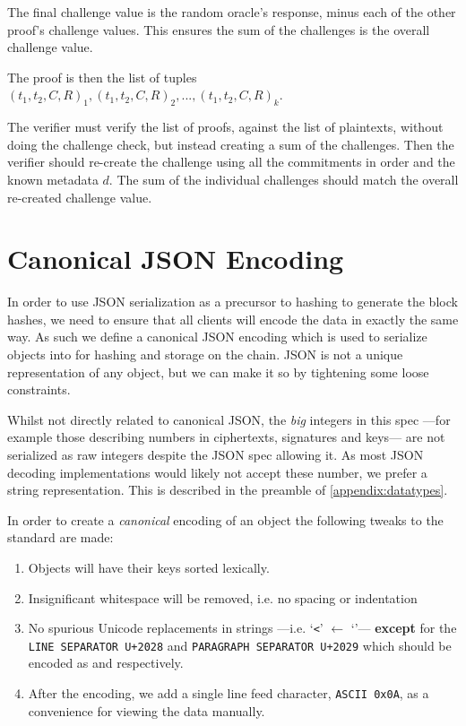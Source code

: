 The final challenge value is the random oracle's response, minus each of the other proof's challenge values. This ensures the sum of the challenges is the overall challenge value.

The proof is then the list of tuples $(t_1, t_2, C, R)_1, (t_1, t_2, C, R)_2, ..., (t_1, t_2, C, R)_k$.

The verifier must verify the list of proofs, against the list of plaintexts, without doing the challenge check, but instead creating a sum of the challenges. Then the verifier should re-create the challenge using all the commitments in order and the known metadata $d$. The sum of the individual challenges should match the overall re-created challenge value.

\section*{Canonical JSON Encoding}
\label{proc:json}

In order to use JSON serialization as a precursor to hashing to generate the block hashes, we need to ensure that all clients will encode the data in exactly the same way. As such we define a canonical JSON encoding which is used to serialize objects into for hashing and storage on the chain. JSON is not a unique representation of any object, but we can make it so by tightening some loose constraints.

Whilst not directly related to canonical JSON, the \emph{big} integers in this spec ---for example those describing numbers in ciphertexts, signatures and keys--- are not serialized as raw integers despite the JSON spec allowing it. As most JSON decoding implementations would likely not accept these number, we prefer a string representation. This is described in the preamble of \autoref{appendix:datatypes}.

In order to create a \emph{canonical} encoding of an object the following tweaks to the standard are made:

\begin{enumerate}
    \item Objects will have their keys sorted lexically.
    \item Insignificant whitespace will be removed, i.e. no spacing or indentation
    \item No spurious Unicode replacements in strings ---i.e. `\texttt{<}' $\leftarrow$ `\texttt{}'--- \textbf{except} for the \texttt{LINE SEPARATOR U+2028} and \texttt{PARAGRAPH SEPARATOR U+2029} which should be encoded as \texttt{} and \texttt{} respectively.
    \item After the encoding, we add a single line feed character, \texttt{ASCII 0x0A}, as a convenience for viewing the data manually.
\end{enumerate}

